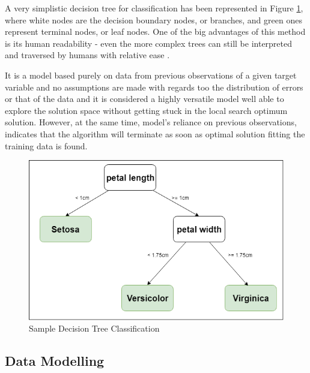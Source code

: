 A very simplistic decision tree for classification has been represented in Figure \ref{fig:decision-tree-sample}, where white nodes are the decision boundary nodes, or branches, and green ones represent terminal nodes, or leaf nodes. One of the big advantages of this method is its human readability - even the more complex trees can still be interpreted and traversed by humans with relative ease . 

It is a model based purely on data from previous observations of a given target variable and no assumptions are made with regards too the distribution of errors or that of the data and it is considered a highly versatile model\cite{ensembleMethodsInMachineLearningDietterich} well able to explore the solution space without getting stuck in the local search optimum solution\cite{ensembleMethodsInMachineLearningDietterich}. However, at the same time, model's reliance on previous observations, indicates that the algorithm will terminate as soon as optimal solution fitting the training data is found.

\begin{figure}[!h]
    \centering
    \includegraphics[scale=0.6]{Figures/decision_tree_sample.png}
    \caption{Sample Decision Tree Classification}
    \label{fig:decision-tree-sample}
\end{figure}



\subsection{Data Modelling}


